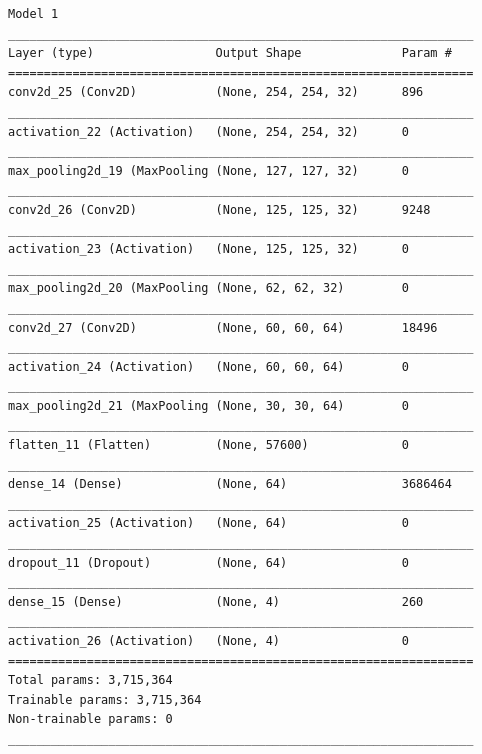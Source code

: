 \documentclass[10pt,a4paper]{article}
\begin{document}
\newpage
\begin{lstlisting}
Model 1
_________________________________________________________________
Layer (type)                 Output Shape              Param #   
=================================================================
conv2d_25 (Conv2D)           (None, 254, 254, 32)      896       
_________________________________________________________________
activation_22 (Activation)   (None, 254, 254, 32)      0         
_________________________________________________________________
max_pooling2d_19 (MaxPooling (None, 127, 127, 32)      0         
_________________________________________________________________
conv2d_26 (Conv2D)           (None, 125, 125, 32)      9248      
_________________________________________________________________
activation_23 (Activation)   (None, 125, 125, 32)      0         
_________________________________________________________________
max_pooling2d_20 (MaxPooling (None, 62, 62, 32)        0         
_________________________________________________________________
conv2d_27 (Conv2D)           (None, 60, 60, 64)        18496     
_________________________________________________________________
activation_24 (Activation)   (None, 60, 60, 64)        0         
_________________________________________________________________
max_pooling2d_21 (MaxPooling (None, 30, 30, 64)        0         
_________________________________________________________________
flatten_11 (Flatten)         (None, 57600)             0         
_________________________________________________________________
dense_14 (Dense)             (None, 64)                3686464   
_________________________________________________________________
activation_25 (Activation)   (None, 64)                0         
_________________________________________________________________
dropout_11 (Dropout)         (None, 64)                0         
_________________________________________________________________
dense_15 (Dense)             (None, 4)                 260       
_________________________________________________________________
activation_26 (Activation)   (None, 4)                 0         
=================================================================
Total params: 3,715,364
Trainable params: 3,715,364
Non-trainable params: 0
_________________________________________________________________
\end{lstlisting}
\end{document}
